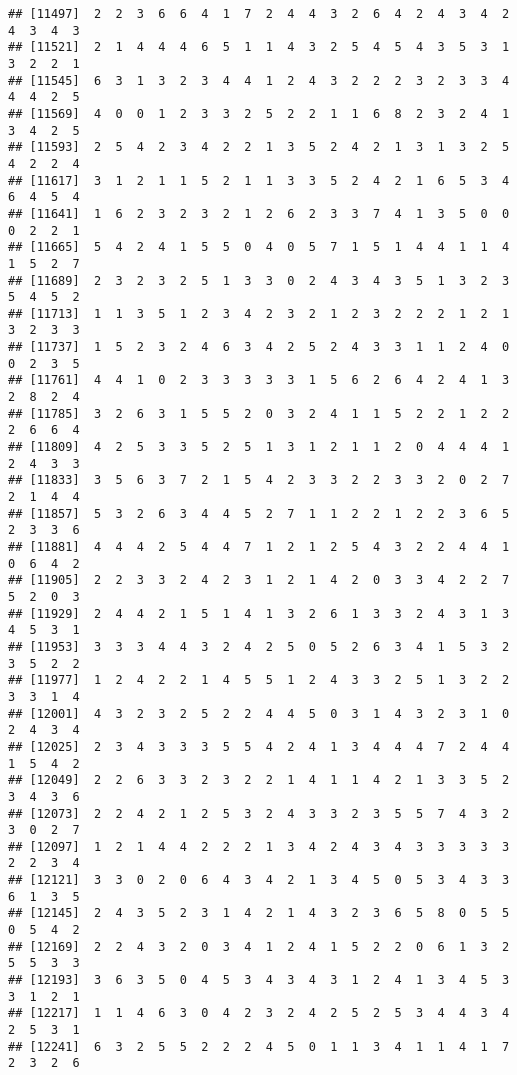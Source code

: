 \documentclass[
]{article}
\begin{document}
\begin{verbatim}
## [11497]  2  2  3  6  6  4  1  7  2  4  4  3  2  6  4  2  4  3  4  2  4  3  4  3
## [11521]  2  1  4  4  4  6  5  1  1  4  3  2  5  4  5  4  3  5  3  1  3  2  2  1
## [11545]  6  3  1  3  2  3  4  4  1  2  4  3  2  2  2  3  2  3  3  4  4  4  2  5
## [11569]  4  0  0  1  2  3  3  2  5  2  2  1  1  6  8  2  3  2  4  1  3  4  2  5
## [11593]  2  5  4  2  3  4  2  2  1  3  5  2  4  2  1  3  1  3  2  5  4  2  2  4
## [11617]  3  1  2  1  1  5  2  1  1  3  3  5  2  4  2  1  6  5  3  4  6  4  5  4
## [11641]  1  6  2  3  2  3  2  1  2  6  2  3  3  7  4  1  3  5  0  0  0  2  2  1
## [11665]  5  4  2  4  1  5  5  0  4  0  5  7  1  5  1  4  4  1  1  4  1  5  2  7
## [11689]  2  3  2  3  2  5  1  3  3  0  2  4  3  4  3  5  1  3  2  3  5  4  5  2
## [11713]  1  1  3  5  1  2  3  4  2  3  2  1  2  3  2  2  2  1  2  1  3  2  3  3
## [11737]  1  5  2  3  2  4  6  3  4  2  5  2  4  3  3  1  1  2  4  0  0  2  3  5
## [11761]  4  4  1  0  2  3  3  3  3  3  1  5  6  2  6  4  2  4  1  3  2  8  2  4
## [11785]  3  2  6  3  1  5  5  2  0  3  2  4  1  1  5  2  2  1  2  2  2  6  6  4
## [11809]  4  2  5  3  3  5  2  5  1  3  1  2  1  1  2  0  4  4  4  1  2  4  3  3
## [11833]  3  5  6  3  7  2  1  5  4  2  3  3  2  2  3  3  2  0  2  7  2  1  4  4
## [11857]  5  3  2  6  3  4  4  5  2  7  1  1  2  2  1  2  2  3  6  5  2  3  3  6
## [11881]  4  4  4  2  5  4  4  7  1  2  1  2  5  4  3  2  2  4  4  1  0  6  4  2
## [11905]  2  2  3  3  2  4  2  3  1  2  1  4  2  0  3  3  4  2  2  7  5  2  0  3
## [11929]  2  4  4  2  1  5  1  4  1  3  2  6  1  3  3  2  4  3  1  3  4  5  3  1
## [11953]  3  3  3  4  4  3  2  4  2  5  0  5  2  6  3  4  1  5  3  2  3  5  2  2
## [11977]  1  2  4  2  2  1  4  5  5  1  2  4  3  3  2  5  1  3  2  2  3  3  1  4
## [12001]  4  3  2  3  2  5  2  2  4  4  5  0  3  1  4  3  2  3  1  0  2  4  3  4
## [12025]  2  3  4  3  3  3  5  5  4  2  4  1  3  4  4  4  7  2  4  4  1  5  4  2
## [12049]  2  2  6  3  3  2  3  2  2  1  4  1  1  4  2  1  3  3  5  2  3  4  3  6
## [12073]  2  2  4  2  1  2  5  3  2  4  3  3  2  3  5  5  7  4  3  2  3  0  2  7
## [12097]  1  2  1  4  4  2  2  2  1  3  4  2  4  3  4  3  3  3  3  3  2  2  3  4
## [12121]  3  3  0  2  0  6  4  3  4  2  1  3  4  5  0  5  3  4  3  3  6  1  3  5
## [12145]  2  4  3  5  2  3  1  4  2  1  4  3  2  3  6  5  8  0  5  5  0  5  4  2
## [12169]  2  2  4  3  2  0  3  4  1  2  4  1  5  2  2  0  6  1  3  2  5  5  3  3
## [12193]  3  6  3  5  0  4  5  3  4  3  4  3  1  2  4  1  3  4  5  3  3  1  2  1
## [12217]  1  1  4  6  3  0  4  2  3  2  4  2  5  2  5  3  4  4  3  4  2  5  3  1
## [12241]  6  3  2  5  5  2  2  2  4  5  0  1  1  3  4  1  1  4  1  7  2  3  2  6

\end{verbatim}
\end{document}
